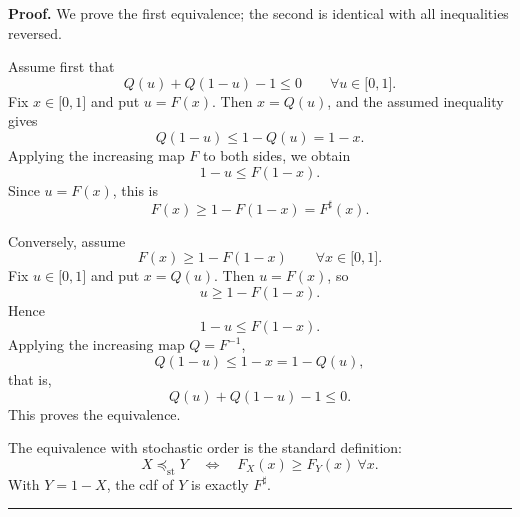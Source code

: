 \documentclass[onecolumn]{article}
\newenvironment{proof}[1][Proof]{\noindent\textbf{#1.} }{\ \rule{0.5em}{0.5em}}
\begin{document}
\begin{proof}
We prove the first equivalence; the second is identical with all
inequalities reversed.

Assume first that 
\begin{equation}
Q(u)+Q(1-u)-1\leq 0\qquad \forall u\in \lbrack 0,1].  \label{1415}
\end{equation}%
Fix $x\in \lbrack 0,1]$ and put $u=F(x)$. Then $x=Q(u)$, and the assumed
inequality gives 
\begin{equation}
Q(1-u)\leq 1-Q(u)=1-x.  \label{1416}
\end{equation}%
Applying the increasing map $F$ to both sides, we obtain 
\begin{equation}
1-u\leq F(1-x).  \label{1417}
\end{equation}%
Since $u=F(x)$, this is 
\begin{equation}
F(x)\geq 1-F(1-x)=F^{\sharp }(x).  \label{1418}
\end{equation}

Conversely, assume 
\begin{equation}
F(x)\geq 1-F(1-x)\qquad \forall x\in \lbrack 0,1].  \label{1419}
\end{equation}%
Fix $u\in \lbrack 0,1]$ and put $x=Q(u)$. Then $u=F(x)$, so 
\begin{equation}
u\geq 1-F(1-x).  \label{1420}
\end{equation}%
Hence 
\begin{equation}
1-u\leq F(1-x).  \label{1421}
\end{equation}%
Applying the increasing map $Q=F^{-1}$, 
\begin{equation}
Q(1-u)\leq 1-x=1-Q(u),  \label{1422}
\end{equation}%
that is, 
\begin{equation}
Q(u)+Q(1-u)-1\leq 0.  \label{1423}
\end{equation}%
This proves the equivalence.

The equivalence with stochastic order is the standard definition: 
\begin{equation}
X\preceq _{\mathrm{st}}Y\quad \Longleftrightarrow \quad F_{X}(x)\geq
F_{Y}(x)\ \forall x.  \label{1424}
\end{equation}%
With $Y=1-X$, the cdf of $Y$ is exactly $F^{\sharp }$. \hfill
\end{proof}
\end{document}
